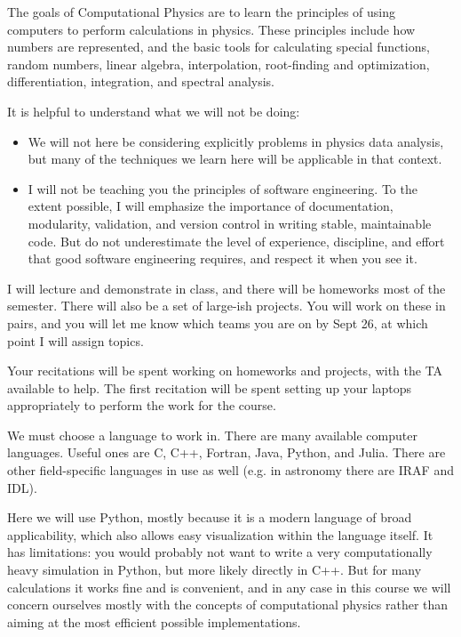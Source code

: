 The goals of Computational Physics are to learn the principles of
using computers to perform calculations in physics. These principles
include how numbers are represented, and the basic tools for
calculating special functions, random numbers, linear algebra,
interpolation, root-finding and optimization, differentiation, 
integration, and spectral analysis.

It is helpful to understand what we will not be doing:
\begin{itemize}
\item We will not here be considering explicitly problems in physics
  data analysis, but many of the techniques we learn here will be
  applicable in that context.
\item I will not be teaching you the principles of software
  engineering. To the extent possible, I will emphasize the importance
  of documentation, modularity, validation, and version control in
  writing stable, maintainable code. But do not underestimate the
  level of experience, discipline, and effort that good software
  engineering requires, and respect it when you see it.
\end{itemize}

I will lecture and demonstrate in class, and there will be homeworks
most of the semester. There will also be a set of large-ish
projects. You will work on these in pairs, and you will let me know
which teams you are on by Sept 26, at which point I will assign
topics.

Your recitations will be spent working on homeworks and projects, with
the TA available to help. The first recitation will be spent setting
up your laptops appropriately to perform the work for the course.

We must choose a language to work in. There are many available
computer languages. Useful ones are C, C++, Fortran, Java, Python, and
Julia. There are other field-specific languages in use as well
(e.g. in astronomy there are IRAF and IDL).

Here we will use Python, mostly because it is a modern language of
broad applicability, which also allows easy visualization within the
language itself. It has limitations: you would probably not want to
write a very computationally heavy simulation in Python, but more
likely directly in C++. But for many calculations it works fine and is
convenient, and in any case in this course we will concern ourselves
mostly with the concepts of computational physics rather than aiming
at the most efficient possible implementations.

